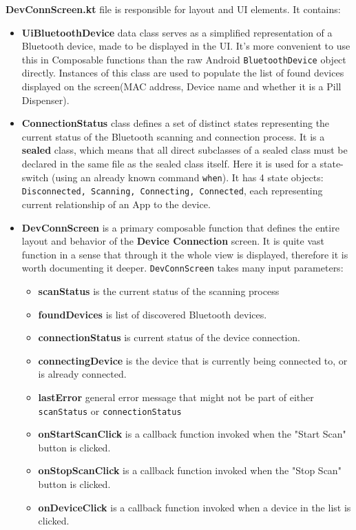 \newpage
\textbf{DevConnScreen.kt} file is responsible for layout and \ac{UI} elements. It contains:
\begin{itemize}
	\item \textbf{UiBluetoothDevice} data class serves as a simplified representation of a Bluetooth device, made to be displayed in the \ac{UI}. It's more convenient to use this in Composable functions than the raw Android \texttt{BluetoothDevice} object directly. Instances of this class are used to populate the list of found devices displayed on the screen(\ac{MAC} address, Device name and whether it is a Pill Dispenser).
	\item \textbf{ConnectionStatus} class defines a set of distinct states representing the current status of the Bluetooth scanning and connection process. It is a \textbf{sealed} class, which means that all direct subclasses of a sealed class must be declared in the same file as the sealed class itself. Here it is used for a state-switch (using an already known command \texttt{when}). It has 4 state objects: \texttt{Disconnected, Scanning, Connecting, Connected}, each representing current relationship of an App to the device.
	\item \textbf{DevConnScreen} is a primary composable function that defines the entire layout and behavior of the \textbf{Device Connection} screen. It is quite vast function in a sense that through it the whole view is displayed, therefore it is worth documenting it deeper. \texttt{DevConnScreen} takes many input parameters:
	\begin{itemize}
		\item \textbf{scanStatus} is the current status of the scanning process
		\item \textbf{foundDevices} is list of discovered Bluetooth devices.
		\item \textbf{connectionStatus} is current status of the device connection.
		\item \textbf{connectingDevice} is the device that is currently being connected to, or is already connected.
		\item \textbf{lastError} general error message that might not be part of either  \texttt{scanStatus} or \texttt{connectionStatus}
		\item \textbf{onStartScanClick} is a callback function invoked when the "Start Scan" button is clicked.
		\item \textbf{onStopScanClick} is a callback function invoked when the "Stop Scan" button is clicked.
		\item \textbf{onDeviceClick} is a callback function invoked when a device in the list is clicked.

\end{itemize}
\end{itemize}
